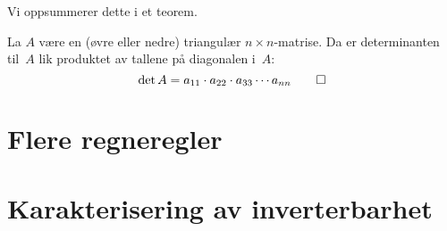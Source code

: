 Vi oppsummerer dette i et teorem.

\begin{thm}
\label{thm:det-diag}
La $A$ være en (øvre eller nedre) triangulær $n \times n$-matrise.  Da
er determinanten til~$A$ lik produktet av tallene på diagonalen i~$A$:
\[
\det A = a_{11} \cdot a_{22} \cdot a_{33} \cdots a_{nn}\qedhere
\]
\end{thm}


\section*{Flere regneregler}



\section*{Karakterisering av inverterbarhet}


\kapittelslutt

